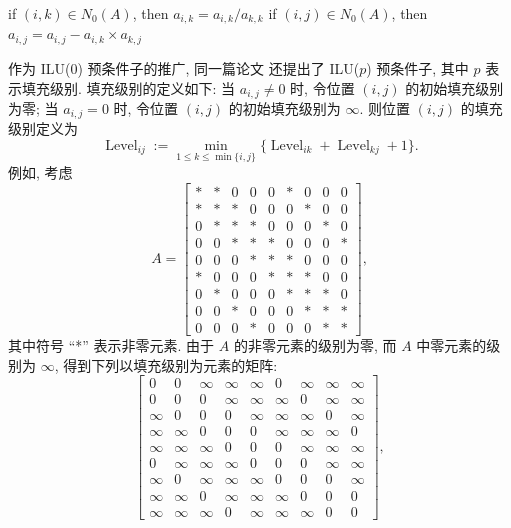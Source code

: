 \begin{algorithm}[H]\caption{{ILU(0) 预条件子}}\label{alg:ilu-zero}\begin{algorithmic}[1]
\State if $(i,k)\in N_0(A)$, then $a_{i,k}=a_{i,k}/a_{k,k}$
\State if $(i,j)\in N_0(A)$, then $a_{i,j}=a_{i,j}-a_{i,k}\times a_{k,j}$
\EndFor\EndFor\EndFor\end{algorithmic}\end{algorithm}
{作为 ILU(0) 预条件子的推广, 同一篇论文  还提出了 ILU($p$) 预条件子, 其中 $p$ 表示填充级别. 填充级别的定义如下: 当 $a_{i,j}\ne0$ 时, 令位置 $(i,j)$ 的初始填充级别为零; 当 $a_{i,j}=0$ 时, 令位置 $(i,j)$ 的初始填充级别为 $\infty$. 则位置 $(i,j)$ 的填充级别定义为}
\begin{equation}\label{eq:ilu-fill-level}\operatorname{Level}_{ij}:=\min_{1\le k\le\min\{i,j\}}\{\operatorname{Level}_{ik}+\operatorname{Level}_{kj}+1\}.\end{equation}
{例如, 考虑}
\begin{equation}\label{eq:ilu-fill-example-matrix}A=\begin{bmatrix}
*&*&0&0&0&*&0&0&0\\
*&*&*&0&0&0&*&0&0\\
0&*&*&*&0&0&0&*&0\\
0&0&*&*&*&0&0&0&*\\
0&0&0&*&*&*&0&0&0\\
*&0&0&0&*&*&*&0&0\\
0&*&0&0&0&*&*&*&0\\
0&0&*&0&0&0&*&*&*\\
0&0&0&*&0&0&0&*&*
\end{bmatrix},\end{equation}
{其中符号 ``*'' 表示非零元素. 由于 $A$ 的非零元素的级别为零, 而 $A$ 中零元素的级别为 $\infty$, 得到下列以填充级别为元素的矩阵:}
\begin{equation}\label{eq:ilu-fill-initial-levels}\begin{bmatrix}
0&0&\infty&\infty&\infty&0&\infty&\infty&\infty\\
0&0&0&\infty&\infty&\infty&0&\infty&\infty\\
\infty&0&0&0&\infty&\infty&\infty&0&\infty\\
\infty&\infty&0&0&0&\infty&\infty&\infty&0\\
\infty&\infty&\infty&0&0&0&\infty&\infty&\infty\\
0&\infty&\infty&\infty&0&0&0&\infty&\infty\\
\infty&0&\infty&\infty&\infty&0&0&0&\infty\\
\infty&\infty&0&\infty&\infty&\infty&0&0&0\\
\infty&\infty&\infty&0&\infty&\infty&\infty&0&0
\end{bmatrix},\end{equation}

